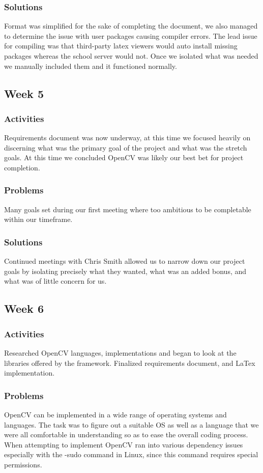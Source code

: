 \documentclass[onecolumn, draftclsnofoot,10pt, compsoc]{IEEEtran}
\begin{document}
\subsubsection{Solutions}
Format was simplified for the sake of completing the document, we also managed to determine the issue with user packages causing compiler errors. The lead issue for compiling was that third-party latex viewers would auto install missing packages whereas the school server would not. Once we isolated what was needed we manually included them and it functioned normally.


\subsection{Week 5}
\subsubsection{Activities}
Requirements document was now underway, at this time we focused heavily on discerning what was the primary goal of the project and what was the stretch goals. At this time we concluded OpenCV was likely our best bet for project completion.

\subsubsection{Problems}
Many goals set during our first meeting where too ambitious to be completable within our timeframe.

\subsubsection{Solutions}
Continued meetings with Chris Smith allowed us to narrow down our project goals by isolating precisely what they wanted, what was an added bonus, and what was of little concern for us.

\subsection{Week 6}
\subsubsection{Activities}
Researched OpenCV languages, implementations and began to look at the libraries offered by the framework. Finalized requirements document, and LaTex implementation.

\subsubsection{Problems}
OpenCV can be implemented in a wide range of operating systems and languages. The task was to figure out a suitable OS as well as a language that we were all comfortable in understanding so as to ease the overall coding process. When attempting to implement OpenCV ran into various dependency issues especially with the -sudo command in Linux, since this command requires special permissions.
\end{document}
